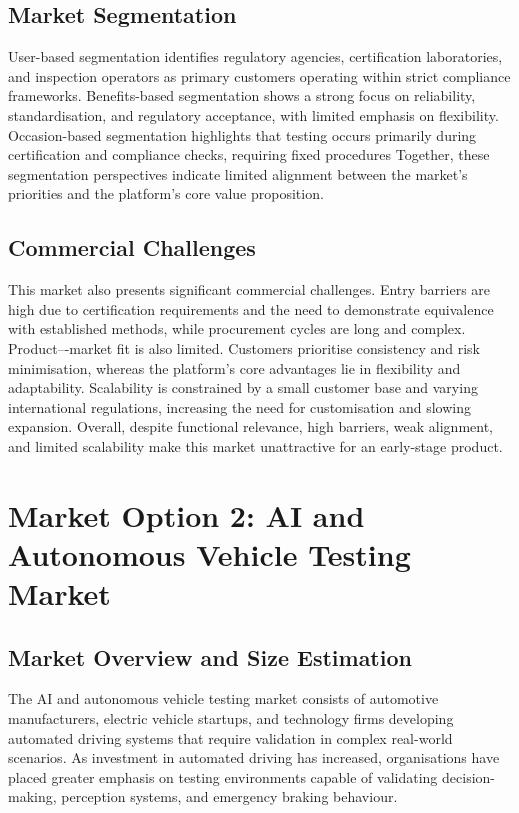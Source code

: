 \subsection{Market Segmentation}

User-based segmentation identifies regulatory agencies, certification laboratories, and inspection operators as primary customers operating within strict compliance frameworks. Benefits-based segmentation shows a strong focus on reliability, standardisation, and regulatory acceptance, with limited emphasis on flexibility. Occasion-based segmentation highlights that testing occurs primarily during certification and compliance checks, requiring fixed procedures
Together, these segmentation perspectives indicate limited alignment between the market’s priorities and the platform’s core value proposition.

\subsection{Commercial Challenges}

This market also presents significant commercial challenges. Entry barriers are high due to certification requirements and the need to demonstrate equivalence with established methods, while procurement cycles are long and complex.
Product–-market fit is also limited. Customers prioritise consistency and risk minimisation, whereas the platform’s core advantages lie in flexibility and adaptability.
Scalability is constrained by a small customer base and varying international regulations, increasing the need for customisation and slowing expansion.
Overall, despite functional relevance, high barriers, weak alignment, and limited scalability make this market unattractive for an early-stage product.

\section{Market Option 2: AI and Autonomous Vehicle Testing Market}

\subsection{Market Overview and Size Estimation}

The AI and autonomous vehicle testing market consists of automotive manufacturers, electric vehicle startups, and technology firms developing automated driving systems that require validation in complex real-world scenarios. As investment in automated driving has increased, organisations have placed greater emphasis on testing environments capable of validating decision-making, perception systems, and emergency braking behaviour.

